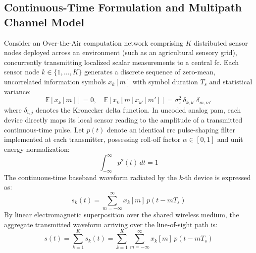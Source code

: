 \documentclass[Markos_Delaportas_1316.tex]{subfiles}
\begin{document}
\subsection{Continuous-Time Formulation and Multipath Channel Model}
\label{subsec:continuous_time_multipath_model}
Consider an Over-the-Air computation network comprising $K$
distributed sensor nodes deployed across an environment
(such as an agricultural sensory grid), concurrently transmitting
localized scalar measurements to a central \gls{fc}.
Each sensor node $k \in \{1, \dots, K\}$ generates a discrete
sequence of zero-mean, uncorrelated information symbols
$x_k[m]$ with symbol duration $T_s$ and statistical variance:
\begin{equation}
    \mathbb{E}[x_k[m]] = 0, \quad \mathbb{E}[x_k[m] x_{k'}[m']] =
    \sigma_x^2 \, \delta_{k,k'} \, \delta_{m,m'}
    \label{eq:sensor_symbol_statistics}
\end{equation}
where $\delta_{i,j}$ denotes the Kronecker delta function. In uncoded
analog \gls{pam}, each device directly maps
its local sensor reading to the amplitude of a transmitted
continuous-time pulse. Let $p(t)$ denote an identical
\gls{rrc} pulse-shaping filter implemented at each transmitter,
possessing roll-off factor $\alpha \in [0, 1]$ and
unit energy normalization:
\begin{equation}
    \int_{-\infty}^{\infty} p^2(t) \, dt = 1
    \label{eq:rrc_continuous_unit_energy_isi}
\end{equation}
The continuous-time baseband waveform radiated by the $k$-th device
is expressed as:
\begin{equation}
    s_k(t) = \sum_{m=-\infty}^{\infty} x_k[m] \, p(t - m T_s)
    \label{eq:single_node_transmit_signal}
\end{equation}
By linear electromagnetic superposition over the shared wireless
medium, the aggregate transmitted waveform
arriving over the line-of-sight path is:
\begin{equation}
    s(t) = \sum_{k=1}^K s_k(t) = \sum_{k=1}^K
    \sum_{m=-\infty}^{\infty} x_k[m] \, p(t - m T_s)
    \label{eq:aggregate_transmit_waveform}
\end{equation}
\end{document}
